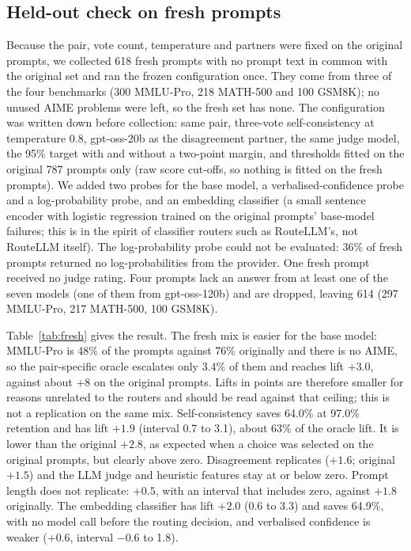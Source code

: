 \documentclass[11pt]{article}
\begin{document}


\subsection{Held-out check on fresh prompts}\label{sec:fresh}
Because the pair, vote count, temperature and partners were fixed on the original prompts, we collected 618 fresh prompts with no prompt text in common with the original set and ran the frozen configuration once. They come from three of the four benchmarks (300 MMLU-Pro, 218 MATH-500 and 100 GSM8K); no unused AIME problems were left, so the fresh set has none. The configuration was written down before collection: same pair, three-vote self-consistency at temperature 0.8, gpt-oss-20b as the disagreement partner, the same judge model, the 95\% target with and without a two-point margin, and thresholds fitted on the original 787 prompts only (raw score cut-offs, so nothing is fitted on the fresh prompts). We added two probes for the base model, a verbalised-confidence probe and a log-probability probe, and an embedding classifier (a small sentence encoder with logistic regression trained on the original prompts' base-model failures; this is in the spirit of classifier routers such as RouteLLM's, not RouteLLM itself). The log-probability probe could not be evaluated: 36\% of fresh prompts returned no log-probabilities from the provider. One fresh prompt received no judge rating. Four prompts lack an answer from at least one of the seven models (one of them from gpt-oss-120b) and are dropped, leaving 614 (297 MMLU-Pro, 217 MATH-500, 100 GSM8K).

Table~\ref{tab:fresh} gives the result. The fresh mix is easier for the base model: MMLU-Pro is 48\% of the prompts against 76\% originally and there is no AIME, so the pair-specific oracle escalates only 3.4\% of them and reaches lift $+3.0$, against about $+8$ on the original prompts. Lifts in points are therefore smaller for reasons unrelated to the routers and should be read against that ceiling; this is not a replication on the same mix. Self-consistency saves 64.0\% at 97.0\% retention and has lift $+1.9$ (interval 0.7 to 3.1), about 63\% of the oracle lift. It is lower than the original $+2.8$, as expected when a choice was selected on the original prompts, but clearly above zero. Disagreement replicates ($+1.6$; original $+1.5$) and the LLM judge and heuristic features stay at or below zero. Prompt length does not replicate: $+0.5$, with an interval that includes zero, against $+1.8$ originally. The embedding classifier has lift $+2.0$ (0.6 to 3.3) and saves 64.9\%, with no model call before the routing decision, and verbalised confidence is weaker ($+0.6$, interval $-0.6$ to 1.8).
\end{document}
